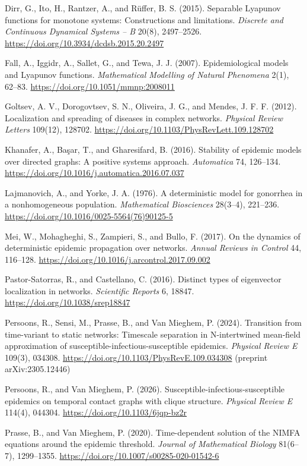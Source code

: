 \documentclass[
  11pt,
  a4paper,
]{article}
\begin{document}
Dirr, G., Ito, H., Rantzer, A., and Rüffer, B. S. (2015). Separable
Lyapunov functions for monotone systems: Constructions and limitations.
\emph{Discrete and Continuous Dynamical Systems -- B} 20(8), 2497--2526.
\url{https://doi.org/10.3934/dcdsb.2015.20.2497}

Fall, A., Iggidr, A., Sallet, G., and Tewa, J. J. (2007).
Epidemiological models and Lyapunov functions. \emph{Mathematical
Modelling of Natural Phenomena} 2(1), 62--83.
\url{https://doi.org/10.1051/mmnp:2008011}

Goltsev, A. V., Dorogovtsev, S. N., Oliveira, J. G., and Mendes, J. F.
F. (2012). Localization and spreading of diseases in complex networks.
\emph{Physical Review Letters} 109(12), 128702.
\url{https://doi.org/10.1103/PhysRevLett.109.128702}

Khanafer, A., Başar, T., and Gharesifard, B. (2016). Stability of
epidemic models over directed graphs: A positive systems approach.
\emph{Automatica} 74, 126--134.
\url{https://doi.org/10.1016/j.automatica.2016.07.037}

Lajmanovich, A., and Yorke, J. A. (1976). A deterministic model for
gonorrhea in a nonhomogeneous population. \emph{Mathematical
Biosciences} 28(3--4), 221--236.
\url{https://doi.org/10.1016/0025-5564(76)90125-5}

Mei, W., Mohagheghi, S., Zampieri, S., and Bullo, F. (2017). On the
dynamics of deterministic epidemic propagation over networks.
\emph{Annual Reviews in Control} 44, 116--128.
\url{https://doi.org/10.1016/j.arcontrol.2017.09.002}

Pastor-Satorras, R., and Castellano, C. (2016). Distinct types of
eigenvector localization in networks. \emph{Scientific Reports} 6,
18847. \url{https://doi.org/10.1038/srep18847}

Persoons, R., Sensi, M., Prasse, B., and Van Mieghem, P. (2024).
Transition from time-variant to static networks: Timescale separation in
N-intertwined mean-field approximation of
susceptible-infectious-susceptible epidemics. \emph{Physical Review E}
109(3), 034308. \url{https://doi.org/10.1103/PhysRevE.109.034308}
(preprint arXiv:2305.12446)

Persoons, R., and Van Mieghem, P. (2026).
Susceptible-infectious-susceptible epidemics on temporal contact graphs
with clique structure. \emph{Physical Review E} 114(4), 044304.
\url{https://doi.org/10.1103/6jqp-bz2r}

Prasse, B., and Van Mieghem, P. (2020). Time-dependent solution of the
NIMFA equations around the epidemic threshold. \emph{Journal of
Mathematical Biology} 81(6--7), 1299--1355.
\url{https://doi.org/10.1007/s00285-020-01542-6}
\end{document}
